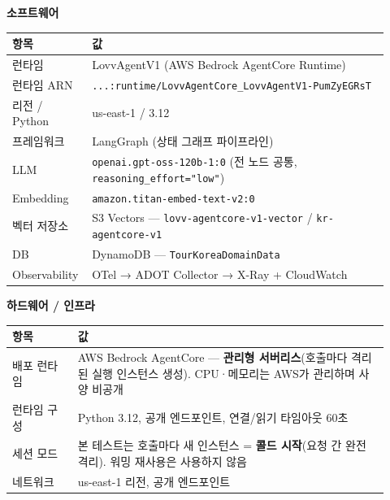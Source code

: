 \documentclass[11pt,a4paper]{article}
\begin{document}
\textbf{소프트웨어}

\begin{small}
\begin{longtable}{@{}>{\RaggedRight\arraybackslash}m{0.160\linewidth}>{\RaggedRight\arraybackslash}m{0.760\linewidth}@{}}
\toprule\noalign{}
항목 & 값 \\
\midrule\noalign{}
\endhead
\bottomrule\noalign{}
\endlastfoot
런타임 & LovvAgentV1 (AWS Bedrock AgentCore Runtime) \\
런타임 ARN & \texttt{.\allowbreak{}.\allowbreak{}.\allowbreak{}:\allowbreak{}runtime/\allowbreak{}LovvAgentCore\_\allowbreak{}LovvAgentV1-\allowbreak{}PumZyEGRsT} \\
리전 / Python & us-east-1 / 3.12 \\
프레임워크 & LangGraph (상태 그래프 파이프라인) \\
LLM & \texttt{openai.\allowbreak{}gpt-\allowbreak{}oss-\allowbreak{}120b-\allowbreak{}1:\allowbreak{}0} (전 노드 공통, \texttt{reasoning\_\allowbreak{}effort="low"}) \\
Embedding & \texttt{amazon.\allowbreak{}titan-\allowbreak{}embed-\allowbreak{}text-\allowbreak{}v2:\allowbreak{}0} \\
벡터 저장소 & S3 Vectors --- \texttt{lovv-\allowbreak{}agentcore-\allowbreak{}v1-\allowbreak{}vector} / \texttt{kr-\allowbreak{}agentcore-\allowbreak{}v1} \\
DB & Dynamo\allowbreak{}DB --- \texttt{TourKoreaDomainData} \\
Observability & OTel → ADOT Collector → X-Ray + CloudWatch \\
\end{longtable}
\end{small}

\textbf{하드웨어 / 인프라}

\begin{small}
\begin{longtable}{@{}>{\RaggedRight\arraybackslash}m{0.160\linewidth}>{\RaggedRight\arraybackslash}m{0.760\linewidth}@{}}
\toprule\noalign{}
항목 & 값 \\
\midrule\noalign{}
\endhead
\bottomrule\noalign{}
\endlastfoot
배포 런타임 & AWS Bedrock AgentCore --- \textbf{관리형 서버리스}(호출마다 격리된 실행 인스턴스 생성). CPU·메모리는 AWS가 관리하며 사양 비공개 \\
런타임 구성 & Python 3.12, 공개 엔드포인트, 연결/읽기 타임아웃 60초 \\
세션 모드 & 본 테스트는 호출마다 새 인스턴스 = \textbf{콜드 시작}(요청 간 완전 격리). 워밍 재사용은 사용하지 않음 \\
네트워크 & us-east-1 리전, 공개 엔드포인트 \\
\end{longtable}
\end{small}
\end{document}
